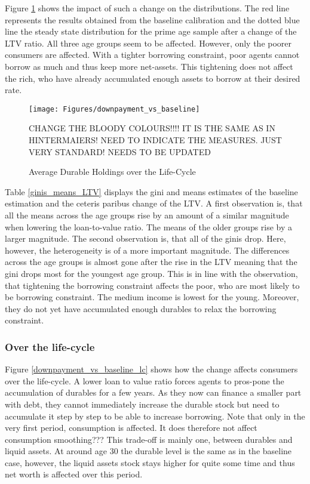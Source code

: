 \documentclass[a4paper,12pt,legno]{article}
\begin{document}
Figure \ref{downpayment_vs_baseline} shows the impact of such a change on the distributions. The red line represents the results obtained from the baseline calibration and the dotted blue line the steady state distribution for the prime age sample after a change of the LTV ratio. All three age groups seem to be affected. However, only the poorer consumers are affected. With a tighter borrowing constraint, poor agents cannot borrow as much and thus keep more net-assets. This tightening does not affect the rich, who have already accumulated enough assets to borrow at their desired rate. 

\begin{figure}[!htbp]
\caption{Average Durable Holdings over the Life-Cycle} 
\label{downpayment_vs_baseline}	%
\centering
\texttt{[image: Figures/downpayment\_vs\_baseline]}  %

\begin{minipage}{0.8\linewidth}
\footnotesize{CHANGE THE BLOODY COLOURS!!!! IT IS THE SAME AS IN HINTERMAIERS! NEED TO INDICATE THE MEASURES. JUST VERY STANDARD! NEEDS TO BE UPDATED}
\end{minipage}

\end{figure}

Table \ref{ginis_means_LTV} displays the gini and means estimates of the baseline estimation and the ceteris paribus change of the LTV. A first observation is, that all the means across the age groups rise by an amount of a similar magnitude when lowering the loan-to-value ratio. The means of the older groups rise by a larger magnitude. The second observation is, that all of the ginis drop. Here, however, the heterogeneity is of a more important magnitude. The differences across the age groups is almost gone after the rise in the LTV meaning that the gini drops most for the youngest age group. This is in line with the observation, that tightening the borrowing constraint affects the poor, who are most likely to be borrowing constraint. The medium income is lowest for the young. Moreover, they do not yet have accumulated enough durables to relax the borrowing constraint. 


\subsubsection{Over the life-cycle}
Figure \ref{downpayment_vs_baseline_lc} shows how the change affects consumers over the life-cycle. A lower loan to value ratio forces agents to  pros-pone the accumulation of durables for a few years. As they now can finance a smaller part with debt, they cannot immediately  increase the durable stock but need to accumulate it step by step to be able to increase borrowing. Note that only in the very first period, consumption is affected. It does therefore not affect consumption smoothing??? This trade-off is mainly one, between durables and liquid assets. At around age 30 the durable level is the same as in the baseline case, however, the liquid assets stock stays higher for quite some time and thus net worth is affected over this period. 
\end{document}
